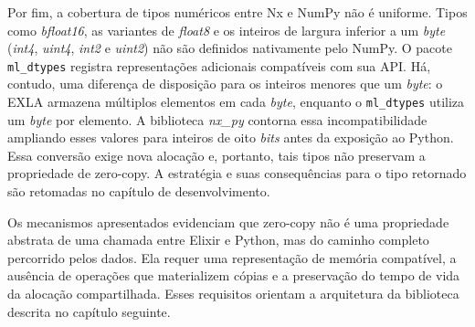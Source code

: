 \begin{sourcecode}[htb]
\caption{Leitura sem cópia de um DeviceBuffer EXLA via ctypes e numpy.frombuffer}
\label{code:ctypes-numpy}
\end{sourcecode}

Por fim, a cobertura de tipos numéricos entre \gls{Nx} e NumPy não é uniforme. Tipos como \textit{bfloat16}, as variantes de \textit{float8} e os inteiros de largura inferior a um \textit{byte} (\textit{int4}, \textit{uint4}, \textit{int2} e \textit{uint2}) não são definidos nativamente pelo NumPy. O pacote \texttt{ml\_dtypes} \citep{mldtypes2024} registra representações adicionais compatíveis com sua \gls{API}. Há, contudo, uma diferença de disposição para os inteiros menores que um \textit{byte}: o \gls{EXLA} armazena múltiplos elementos em cada \textit{byte}, enquanto o \texttt{ml\_dtypes} utiliza um \textit{byte} por elemento. A biblioteca \textit{nx\_py} contorna essa incompatibilidade ampliando esses valores para inteiros de oito \textit{bits} antes da exposição ao Python. Essa conversão exige nova alocação e, portanto, tais tipos não preservam a propriedade de zero-copy. A estratégia e suas consequências para o tipo retornado são retomadas no capítulo de desenvolvimento.

Os mecanismos apresentados evidenciam que zero-copy não é uma propriedade abstrata de uma chamada entre Elixir e Python, mas do caminho completo percorrido pelos dados. Ela requer uma representação de memória compatível, a ausência de operações que materializem cópias e a preservação do tempo de vida da alocação compartilhada. Esses requisitos orientam a arquitetura da biblioteca descrita no capítulo seguinte.
